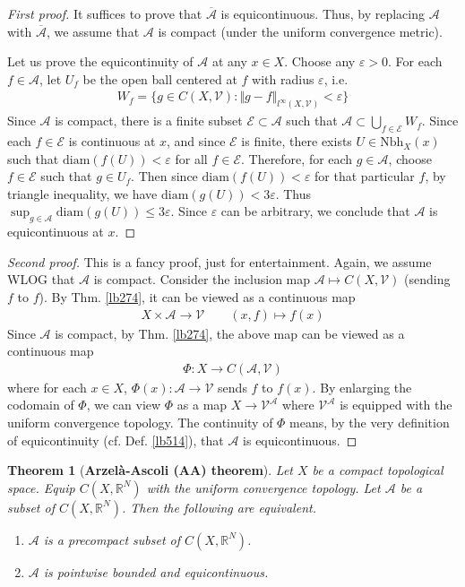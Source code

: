 \documentclass[12pt,b5paper,notitlepage]{article}
\theoremstyle{definition}
\theoremstyle{plain}
\newtheorem{thm}[df]{Theorem}
\newcommand{\mc}{\mathcal}
\newcommand{\ovl}{\overline}
\newcommand{\scr}{\mathscr}
\newcommand{\Rbb}{\mathbb R}
\newcommand{\Nbh}{\mathrm{Nbh}}
\newcommand{\diam}{\mathrm{diam}}
\newcommand{\eps}{\varepsilon}
\numberwithin{equation}{section}
\begin{document}
\begin{proof}[First proof]
It suffices to prove that $\ovl{\scr A}$ is equicontinuous. Thus, by replacing $\scr A$ with $\ovl{\scr A}$, we assume that $\scr A$ is compact (under the uniform convergence metric).

Let us prove the equicontinuity of $\scr A$ at any $x\in X$. Choose any $\eps>0$. For each $f\in\scr A$, let $U_f$ be the open ball centered at $f$ with radius $\eps$, i.e.
\begin{align*}
W_f=\big\{g\in C(X,\mc V):\Vert g-f\Vert_{l^\infty(X,\mc V)}<\eps\big\}
\end{align*}
Since $\scr A$ is compact, there is a finite subset $\mc E\subset\scr A$ such that $\scr A\subset\bigcup_{f\in\mc E}W_f$. Since each $f\in\mc E$ is continuous at $x$, and since $\mc E$ is finite, there exists $U\in\Nbh_X(x)$ such that $\diam(f(U))<\eps$ for all $f\in\mc E$. Therefore, for each $g\in\scr A$, choose $f\in\mc E$ such that $g\in U_f$. Then since $\diam (f(U))<\eps$ for that particular $f$, by triangle inequality, we have $\diam (g(U))<3\eps$. Thus $\sup_{g\in\scr A}\diam(g(U))\leq 3\eps$. Since $\eps$ can be arbitrary, we conclude that $\scr A$ is equicontinuous at $x$.
\end{proof}



\begin{proof}[Second proof]
This is a fancy proof, just for entertainment. Again, we assume WLOG that $\scr A$ is compact. Consider the inclusion map $\scr A\mapsto C(X,\mc V)$ (sending $f$ to $f$). By Thm. \ref{lb274}, it can be viewed as a continuous map
\begin{gather*}
X\times\scr A\rightarrow \mc V\qquad (x,f)\mapsto f(x)
\end{gather*}
Since $\scr A$ is compact, by Thm. \ref{lb274}, the above map can be viewed as a continuous map
\begin{align*}
\Phi:X\rightarrow C(\scr A,\mc V)
\end{align*}
where for each $x\in X$, $\Phi(x):\scr A\rightarrow \mc V$ sends $f$ to $f(x)$. By enlarging the codomain of $\Phi$, we can view $\Phi$ as a map $X\rightarrow \mc V^{\scr A}$ where $\mc V^{\scr A}$ is equipped with the uniform convergence topology. The continuity of $\Phi$ means, by the very definition of equicontinuity (cf. Def. \ref{lb514}), that $\scr A$ is equicontinuous.
\end{proof}



\begin{thm}[\textbf{Arzel\`a-Ascoli (AA) theorem}] \label{lb516}
Let $X$ be a compact topological space. Equip $C(X,\Rbb^N)$ with the uniform convergence topology. Let $\scr A$ be a subset of $C(X,\Rbb^N)$. Then the following are equivalent.
\begin{enumerate}[label=(\arabic*)]
\item $\scr A$ is a precompact subset of $C(X,\Rbb^N)$.
\item $\scr A$ is pointwise bounded and equicontinuous.
\end{enumerate}
\end{thm}
\end{document}
